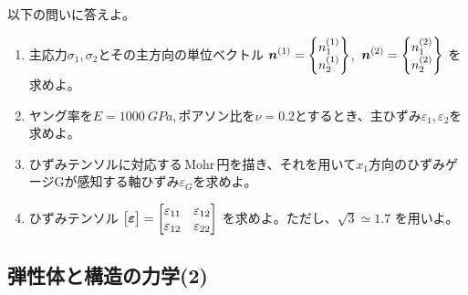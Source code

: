 {  以下の問いに答えよ。
  \begin{enumerate}[label=\arabic*.]
    \item 主応力$\sigma_1$,\,$\sigma_2$とその主方向の単位ベクトル
          $\displaystyle {\bm{n}}^{(1)} = \left\{ \begin{matrix} n_1^{(1)}\\ n_2^{(1)}\end{matrix}\right\}$,\,
          $\displaystyle {\bm{n}}^{(2)} = \left\{ \begin{matrix} n_1^{(2)}\\ n_2^{(2)}\end{matrix}\right\}$
          を求めよ。
    \item ヤング率を$E = \SI{1000}{GPa}$,\,ポアソン比を$\nu = 0.2$とするとき、主ひずみ$\varepsilon_1$,\,$\varepsilon_2$を求めよ。
    \item ひずみテンソルに対応する\,Mohr\,円を描き、それを用いて$x_1$方向のひずみゲージGが感知する軸ひずみ$\varepsilon_G$を求めよ。
    \item ひずみテンソル
          $\displaystyle \begin{bmatrix} \bm{\varepsilon} \end{bmatrix} = \begin{bmatrix} \varepsilon_{11} & \varepsilon_{12}\\ \varepsilon_{12} & \varepsilon_{22} \end{bmatrix}$
          を求めよ。ただし、$\sqrt{3} \simeq 1.7$ を用いよ。
  \end{enumerate}
}

\subsection{弾性体と構造の力学(2)}
